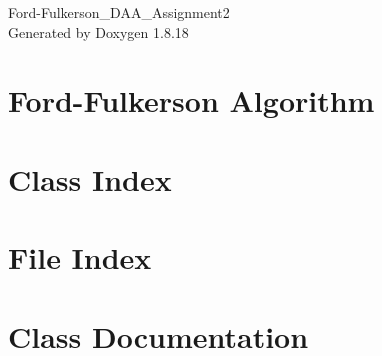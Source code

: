 \let\mypdfximage\pdfximage\def\pdfximage{\immediate\mypdfximage}\documentclass[twoside]{book}
\newcommand{\+}{\discretionary{\mbox{\scriptsize$\hookleftarrow$}}{}{}}
\newcommand{\clearemptydoublepage}{%
  \newpage{\pagestyle{empty}\cleardoublepage}%
}
\begin{document}
\hypersetup{pageanchor=false,
             bookmarksnumbered=true,
             pdfencoding=unicode
            }
\begin{titlepage}
\vspace*{7cm}
\begin{center}%
{\Large Ford-\/\+Fulkerson\+\_\+\+D\+A\+A\+\_\+\+Assignment2 }\\
\vspace*{1cm}
{\large Generated by Doxygen 1.8.18}\\
\end{center}
\end{titlepage}
\clearemptydoublepage
{}
\tableofcontents
\clearemptydoublepage
{}
\hypersetup{pageanchor=true}

\chapter{Ford-\/\+Fulkerson Algorithm}
\label{md__r_e_a_d_m_e}

\chapter{Class Index}

\chapter{File Index}

\chapter{Class Documentation}

\end{document}
